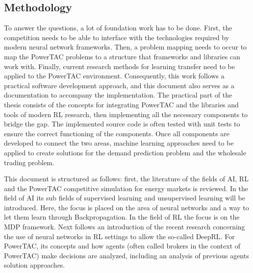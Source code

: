 \subsection{Methodology}
\label{sec:methodology}
To answer the questions, a lot of foundation work has to be done. First, the competition needs to be able to interface
with the technologies required by modern neural network frameworks. Then,  a problem mapping needs to occur to map the
\ac{PowerTAC} problems to a structure that frameworks and libraries can work with. Finally, current research methods for
learning transfer need to be applied to the \ac{PowerTAC} environment. Consequently, this work follows a practical
software development approach, and this document also serves as a documentation to accompany the implementation. The
practical part of the thesis consists of the concepts for integrating \ac{PowerTAC} and the libraries and tools of
modern \ac{RL} research, then implementing all the necessary components to bridge the gap. The implemented source code is
often tested with unit tests to ensure the correct functioning of the components. Once all components are
developed to connect the two areas, machine learning approaches need to be applied to create solutions for the demand
prediction problem and the wholesale trading problem.

This document is structured as follows: first, the literature of the fields of \ac{AI}, \ac{RL} and the \ac{PowerTAC}
competitive simulation for energy markets is reviewed. In the field of AI its sub fields of supervised learning and
unsupervised learning will be introduced. Here, the focus is placed on the area of neural networks and a way to let them
learn through Backpropagation. In the field of \ac{RL} the focus is on the \ac{MDP} framework.  Next follows an
introduction of the recent research concerning the use of neural networks in \ac{RL} settings to allow the so-called
\ac{DeepRL}. For \ac{PowerTAC}, its concepts and how agents (often called brokers in the context of \ac{PowerTAC}) make
decisions are analyzed, including an analysis of previous agents solution approaches. 


